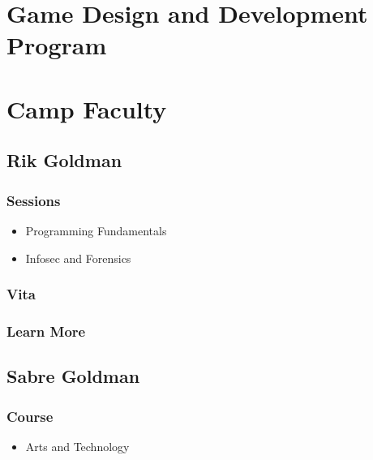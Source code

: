 \documentclass[letterpaper,10pt,english]{sphinxmanual}
\begin{document}
\chapter{Game Design and Development Program}
\label{gamedev::doc}\label{gamedev:index-0}\label{gamedev:game-design-and-development-program}

\chapter{Camp Faculty}
\label{faculty:camp-faculty}\label{faculty::doc}

\section{Rik Goldman}
\label{faculty:rik-goldman}

\subsection{Sessions}
\label{faculty:sessions}\begin{itemize}
\item {} 
Programming Fundamentals

\item {} 
Infosec and Forensics

\end{itemize}


\subsection{Vita}
\label{faculty:vita}

\subsection{Learn More}
\label{faculty:learn-more}

\section{Sabre Goldman}
\label{faculty:sabre-goldman}

\subsection{Course}
\label{faculty:course}\begin{itemize}
\item {} 
Arts and Technology

\end{itemize}
\end{document}
